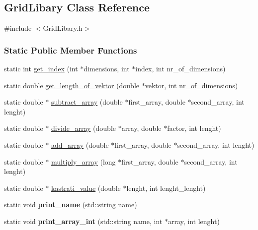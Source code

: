 \hypertarget{a00020}{}\subsection{Grid\+Libary Class Reference}
\label{a00020}


{\ttfamily \#include $<$Grid\+Libary.\+h$>$}

\subsubsection*{Static Public Member Functions}
\begin{DoxyCompactItemize}
\item 
static int \hyperlink{a00020_ac0e3d277ebc93daebb97a05c8e25ea47}{get\+\_\+index} (int $\ast$dimensions, int $\ast$index, int nr\+\_\+of\+\_\+dimensions)
\item 
static double \hyperlink{a00020_a5537f26ba0b00eebcd3a8e6eac78100e}{get\+\_\+length\+\_\+of\+\_\+vektor} (double $\ast$vektor, int nr\+\_\+of\+\_\+dimensions)
\item 
static double $\ast$ \hyperlink{a00020_afd60742ee98fa80c155acee09d494975}{subtract\+\_\+array} (double $\ast$first\+\_\+array, double $\ast$second\+\_\+array, int lenght)
\item 
static double $\ast$ \hyperlink{a00020_a953ab2fc4cfd4665a11b48f640fb3415}{divide\+\_\+array} (double $\ast$array, double $\ast$factor, int lenght)
\item 
static double $\ast$ \hyperlink{a00020_a71d11c79c34b94a00dafc6bb52e17e58}{add\+\_\+array} (double $\ast$first\+\_\+array, double $\ast$second\+\_\+array, int lenght)
\item 
static double $\ast$ \hyperlink{a00020_aeb32c218fb79e7e3973cbd56fba2bee8}{multiply\+\_\+array} (long $\ast$first\+\_\+array, double $\ast$second\+\_\+array, int lenght)
\item 
static double $\ast$ \hyperlink{a00020_ad0f03d68e26782070a1e972b4bd1bf9d}{kastrati\+\_\+value} (double $\ast$lenght, int lenght\+\_\+lenght)
\item 
\hypertarget{a00020_ac243c3a3e220df64c8b5958f04ec8916}{}static void {\bfseries print\+\_\+name} (std\+::string name)\label{a00020_ac243c3a3e220df64c8b5958f04ec8916}

\item 
\hypertarget{a00020_a5a7d45b805e4b9f2b885cb6fecab2c7d}{}static void {\bfseries print\+\_\+array\+\_\+int} (std\+::string name, int $\ast$array, int lenght)\label{a00020_a5a7d45b805e4b9f2b885cb6fecab2c7d}


\end{DoxyCompactItemize}
